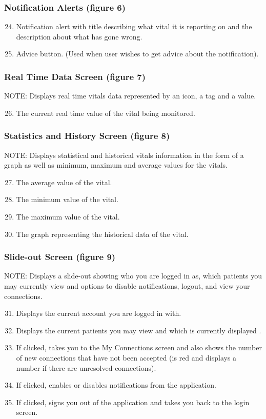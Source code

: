 \subsubsection{Notification Alerts (figure 6)}
\begin{enumerate}
\setcounter{enumi}{23}
	\item Notification alert with title describing what vital it is reporting on and the description about what has gone wrong. 
	\item Advice button. (Used when user wishes to get advice about the notification).   
\end{enumerate}
\subsubsection{Real Time Data Screen (figure 7)}
NOTE:  Displays real time vitals data represented by an icon, a tag and a value.
\begin{enumerate}
\setcounter{enumi}{25}
	\item The current real time value of the vital being monitored. 
\end{enumerate}

\subsubsection{Statistics and History Screen (figure 8)}
NOTE: Displays statistical and historical vitals information in the form of a graph as well as minimum, maximum and average values for the vitals.
\begin{enumerate}
\setcounter{enumi}{26}
	\item The average value of the vital. 
	\item The minimum value of the vital. 
	\item The maximum value of the vital. 
	\item The graph representing the historical data of the vital. 
\end{enumerate}

\subsubsection{Slide-out Screen (figure 9)}
NOTE: Displays a slide-out showing who you are logged in as, which patients you may currently view and options to disable notifications, logout, and view your connections. 
\begin{enumerate}
\setcounter{enumi}{30}
	\item Displays the current account you are logged in with. 
	\item Displays the current patients you may view and which is currently displayed . 
	\item If clicked, takes you to the My Connections screen and also shows the number of new connections that have not been accepted (is red and displays a number if there are unresolved connections). 
	\item If clicked, enables or disables notifications from the application. 
    \item If clicked, signs you out of the application and takes you back to the login screen. 
\end{enumerate}

